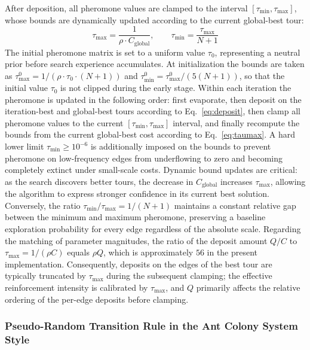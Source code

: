After deposition, all pheromone values are clamped to the interval $[\tau_{\min}, \tau_{\max}]$, whose bounds are dynamically updated according to the current global-best tour:
\begin{equation}
\tau_{\max} = \frac{1}{\rho \cdot C_{\mathrm{global}}}, \qquad
\tau_{\min} = \frac{\tau_{\max}}{N+1}
\label{eq:taumax}
\end{equation}
The initial pheromone matrix is set to a uniform value $\tau_0$, representing a neutral prior before search experience accumulates. At initialization the bounds are taken as $\tau_{\max}^{0} = 1/(\rho \cdot \tau_0 \cdot (N+1))$ and $\tau_{\min}^{0} = \tau_{\max}^{0}/(5(N+1))$, so that the initial value $\tau_0$ is not clipped during the early stage. Within each iteration the pheromone is updated in the following order: first evaporate, then deposit on the iteration-best and global-best tours according to Eq.~\textcolor{blue}{\eqref{eq:deposit}}, then clamp all pheromone values to the current $[\tau_{\min}, \tau_{\max}]$ interval, and finally recompute the bounds from the current global-best cost according to Eq.~\textcolor{blue}{\eqref{eq:taumax}}. A hard lower limit $\tau_{\min} \geq 10^{-6}$ is additionally imposed on the bounds to prevent pheromone on low-frequency edges from underflowing to zero and becoming completely extinct under small-scale costs. Dynamic bound updates are critical: as the search discovers better tours, the decrease in $C_{\mathrm{global}}$ increases $\tau_{\max}$, allowing the algorithm to express stronger confidence in its current best solution. Conversely, the ratio $\tau_{\min}/\tau_{\max} = 1/(N+1)$ maintains a constant relative gap between the minimum and maximum pheromone, preserving a baseline exploration probability for every edge regardless of the absolute scale. Regarding the matching of parameter magnitudes, the ratio of the deposit amount $Q/C$ to $\tau_{\max} = 1/(\rho C)$ equals $\rho Q$, which is approximately $56$ in the present implementation. Consequently, deposits on the edges of the best tour are typically truncated by $\tau_{\max}$ during the subsequent clamping; the effective reinforcement intensity is calibrated by $\tau_{\max}$, and $Q$ primarily affects the relative ordering of the per-edge deposits before clamping.

\subsubsection{Pseudo-Random Transition Rule in the Ant Colony System Style}

